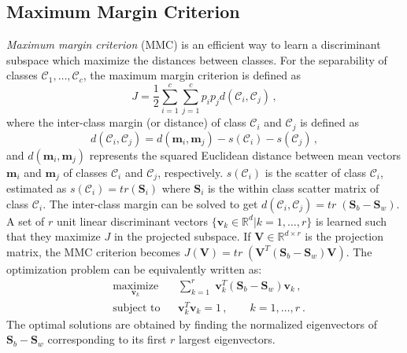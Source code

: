 \documentclass[runningheads]{llncs}
\begin{document}
\subsection{Maximum Margin Criterion}
\label{ssec:MMC}
\textit{Maximum margin criterion} (MMC) \cite{haifeng:mmc,mmc:pami} is an efficient way to learn a discriminant subspace which maximize the distances between classes. 
For the separability of classes $\mathcal{C}_1,\ldots,\mathcal{C}_c$, the maximum margin criterion is defined as 
\begin{equation}
\label{eqn:MMC1}
J  = \frac{1}{2} \sum\limits_{i=1}^{c} \sum\limits_{j=1}^{c}  \textit{p}_i \textit{p}_j d(\mathcal{C}_i,\mathcal{C}_j) \,,
\end{equation}
where the inter-class margin (or distance) of class $\mathcal{C}_i$ and $\mathcal{C}_j$ is defined as 
\begin{equation}
\label{eqn:MMC2}
d(\mathcal{C}_i,\mathcal{C}_j) = d(\mathbf{m}_i,\mathbf{m}_j) - s(\mathcal{C}_i) - s(\mathcal{C}_j) \,,
\end{equation}
and $d(\mathbf{m}_i,\mathbf{m}_j)$ represents the squared Euclidean distance between mean vectors $\mathbf{m}_i$ and $\mathbf{m}_j$ of classes $\mathcal{C}_i$ and $\mathcal{C}_j$, respectively. $s(\mathcal{C}_i)$ is the scatter of class $\mathcal{C}_i$, estimated as $s(\mathcal{C}_i) = tr(\mathbf{S}_i)$ where $\mathbf{S}_i$ is the within class scatter matrix of class $\mathcal{C}_i$. The inter-class margin can be solved to get $d(\mathcal{C}_i,\mathcal{C}_j)  = \textit{tr} \;  (\mathbf{S}_b  -  \mathbf{S}_w)$.
A set of $r$ unit linear discriminant vectors $\{\mathbf{v}_k \in \mathbb{R}^{d} | k=1,\ldots,r\}$ is learned such that they maximize $J$ in the projected subspace.
If $\mathbf{V} \in \mathbb{R}^{d \times r}$ is the projection matrix, the MMC criterion becomes $J(\mathbf{V})  = \textit{tr} \;  (\mathbf{V}^T (\mathbf{S}_b  -  \mathbf{S}_w) \mathbf{V})$. The optimization problem can be equivalently written as:
\begin{equation}
\begin{aligned}
& \underset{\mathbf{v}_{k}}{\text{maximize}} & &\sum\limits_{k=1}^r \;  \mathbf{v}^T_{k} (\mathbf{S}_b  -  \mathbf{S}_w) \mathbf{v}_{k} \,,\\
\label{eqn:OptMMC}
& \text{subject to}     & & \mathbf{v}^T_{k} \mathbf{v}_{k} = 1 \,, \qquad k=1,\ldots,r \ .
\end{aligned} 
\end{equation}
The optimal solutions are obtained by finding the normalized eigenvectors of $\mathbf{S}_b - \mathbf{S}_w$ corresponding to its first $r$ largest eigenvectors. 
\end{document}
